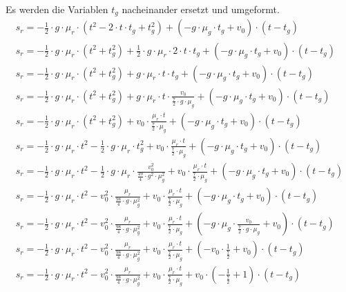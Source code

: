 Es werden die Variablen $t_g$ nacheinander ersetzt und umgeformt.
\begin{align}
    s_r = - \frac{1}{2} \cdot g \cdot \mu_r \cdot (t^2 - 2 \cdot t \cdot t_g + t_g^2) + (-g \cdot \mu_g \cdot t_g + v_0) \cdot (t - t_g)\\
    s_r = - \frac{1}{2} \cdot g \cdot \mu_r \cdot (t^2 + t_g^2) + \frac{1}{2} \cdot g \cdot \mu_r \cdot 2 \cdot t \cdot t_g + (-g \cdot \mu_g \cdot t_g + v_0) \cdot (t - t_g)\\
    s_r = - \frac{1}{2} \cdot g \cdot \mu_r \cdot (t^2 + t_g^2) + g \cdot \mu_r \cdot t \cdot t_g + (-g \cdot \mu_g \cdot t_g + v_0) \cdot (t - t_g)\\
    s_r = - \frac{1}{2} \cdot g \cdot \mu_r \cdot (t^2 + t_g^2) + g \cdot \mu_r \cdot t \cdot \frac{v_0}{\frac{7}{2} \cdot g \cdot \mu_g} + (-g \cdot \mu_g \cdot t_g + v_0) \cdot (t - t_g)\\
    s_r = - \frac{1}{2} \cdot g \cdot \mu_r \cdot (t^2 + t_g^2) + v_0 \cdot \frac{\mu_r \cdot t}{\frac{7}{2} \cdot \mu_g} + (-g \cdot \mu_g \cdot t_g + v_0) \cdot (t - t_g)\\
    s_r = - \frac{1}{2} \cdot g \cdot \mu_r \cdot t^2 - \frac{1}{2} \cdot g \cdot \mu_r \cdot t_g^2 + v_0 \cdot \frac{\mu_r \cdot t}{\frac{7}{2} \cdot \mu_g} + (-g \cdot \mu_g \cdot t_g + v_0) \cdot (t - t_g)\\
    s_r = - \frac{1}{2} \cdot g \cdot \mu_r \cdot t^2 - \frac{1}{2} \cdot g \cdot \mu_r \cdot \frac{v_0^2}{\frac{49}{4} \cdot g^2 \cdot \mu_g^2} + v_0 \cdot \frac{\mu_r \cdot t}{\frac{7}{2} \cdot \mu_g} + (-g \cdot \mu_g \cdot t_g + v_0) \cdot (t - t_g)\\
    s_r = - \frac{1}{2} \cdot g \cdot \mu_r \cdot t^2 - v_0^2 \cdot \frac{\mu_r}{\frac{98}{4} \cdot g \cdot \mu_g^2} + v_0 \cdot \frac{\mu_r \cdot t}{\frac{7}{2} \cdot \mu_g} + (-g \cdot \mu_g \cdot t_g + v_0) \cdot (t - t_g)\\
    s_r = - \frac{1}{2} \cdot g \cdot \mu_r \cdot t^2 - v_0^2 \cdot \frac{\mu_r}{\frac{98}{4} \cdot g \cdot \mu_g^2} + v_0 \cdot \frac{\mu_r \cdot t}{\frac{7}{2} \cdot \mu_g} + (-g \cdot \mu_g \cdot \frac{v_0}{\frac{7}{2} \cdot g \cdot \mu_g} + v_0) \cdot (t - t_g)\\
    s_r = - \frac{1}{2} \cdot g \cdot \mu_r \cdot t^2 - v_0^2 \cdot \frac{\mu_r}{\frac{98}{4} \cdot g \cdot \mu_g^2} + v_0 \cdot \frac{\mu_r \cdot t}{\frac{7}{2} \cdot \mu_g} + (-v_0 \cdot \frac{1}{\frac{7}{2}} + v_0) \cdot (t - t_g)\\
    s_r = - \frac{1}{2} \cdot g \cdot \mu_r \cdot t^2 - v_0^2 \cdot \frac{\mu_r}{\frac{98}{4} \cdot g \cdot \mu_g^2} + v_0 \cdot \frac{\mu_r \cdot t}{\frac{7}{2} \cdot \mu_g} + v_0 \cdot (-\frac{1}{\frac{7}{2}} + 1) \cdot (t - t_g)\\

\end{align}
